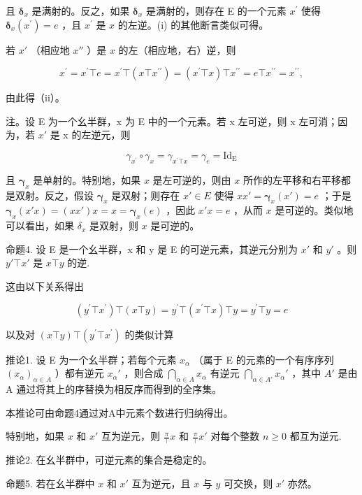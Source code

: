 且 \(\pmb{\delta}_{x}\) 是满射的。反之，如果 \(\pmb{\delta}_{x}\) 是满射的，则存在 E 的一个元素 \(x^{\prime}\) 使得 \(\pmb{\delta}_{x}(x^{\prime}) = e\) ，且 \(x^{\prime}\) 是 \(x\) 的左逆。(i) 的其他断言类似可得。

若 \(x'\) （相应地 \(x''\) ）是 \(x\) 的左（相应地，右）逆，则

\[
x ^ {\prime} = x ^ {\prime} \top e = x ^ {\prime} \top (x \top x ^ {\prime \prime}) = (x ^ {\prime} \top x) \top x ^ {\prime \prime} = e \top x ^ {\prime \prime} = x ^ {\prime \prime},
\]

由此得（ii）。

注。设 E 为一个幺半群，x 为 E 中的一个元素。若 x 左可逆，则 x 左可消；因为，若 \(x'\) 是 x 的左逆元，则

\[
\gamma_ {x ^ {\prime}} \circ \gamma_ {x} = \gamma_ {x ^ {\prime} \top x} = \gamma_ {e} = \mathrm{Id} _ {\mathrm{E}}
\]

且 \(\pmb{\gamma}_{x}\) 是单射的。特别地，如果 \(x\) 是左可逆的，则由 \(x\) 所作的左平移和右平移都是双射。反之，假设 \(\pmb{\gamma}_{x}\) 是双射；则存在 \(x' \in E\) 使得 \(xx' = \pmb{\gamma}_{x}(x') = e\) ；于是 \(\pmb{\gamma}_{x}(x' x) = (xx') x = x = \pmb{\gamma}_{x}(e)\) ，因此 \(x' x = e\) ，从而 \(x\) 是可逆的。类似地可以看出，如果 \(\delta_{x}\) 是双射，则 \(x\) 是可逆的。

命题4. 设 E 是一个幺半群，x 和 y 是 E 的可逆元素，其逆元分别为 \(x'\) 和 \(y'\) 。则 \(y' \top x'\) 是 \(x \top y\) 的逆.

这由以下关系得出

\[
\left(y ^ {\prime} \top x ^ {\prime}\right) \top (x \top y) = y ^ {\prime} \top \left(x ^ {\prime} \top x\right) \top y = y ^ {\prime} \top y = e
\]

以及对 \((x\top y)\top (y^{\prime}\top x^{\prime})\) 的类似计算

推论1. 设 E 为一个幺半群；若每个元素 \(x_{\alpha}\) （属于 E 的元素的一个有序序列 \((x_{\alpha})_{\alpha \in A}\) ）都有逆元 \(x_{\alpha}'\) ，则合成 \(\bigcap_{\alpha \in A} x_{\alpha}\) 有逆元 \(\bigcap_{\alpha \in A'} x_{\alpha}'\) ，其中 \(A'\) 是由 A 通过将其上的序替换为相反序而得到的全序集。

本推论可由命题4通过对A中元素个数进行归纳得出。

特别地，如果 \(x\) 和 \(x'\) 互为逆元，则 \(\frac{\pi}{\top} x\) 和 \(\frac{\pi}{\top} x'\) 对每个整数 \(n \geqslant 0\) 都互为逆元.

推论2. 在幺半群中，可逆元素的集合是稳定的。

命题5. 若在幺半群中 \(x\) 和 \(x'\) 互为逆元，且 \(x\) 与 \(y\) 可交换，则 \(x'\) 亦然。

